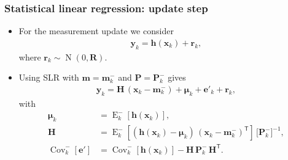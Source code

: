 \documentclass[first=dgreen,second=purple,presentation]{elecslides}
\newcommand{\mbf}[1]{\mathbf{#1}}
\newcommand{\mathbold}[1]{\bm{#1}}
\newcommand{\T}[0]{\mathsf{T}}
\DeclareMathOperator{\Cov}{Cov}
\DeclareMathOperator{\E}{E}
\DeclareMathOperator{\N}{N}
\newcommand{\vmu}[0]{\mathbold{\mu}}
\newcommand{\ve}{\mbf{e}}
\newcommand{\vh}{\mbf{h}}
\newcommand{\vm}{\mbf{m}}
\newcommand{\vr}{\mbf{r}}
\newcommand{\vx}{\mbf{x}}
\newcommand{\vy}{\mbf{y}}
\newcommand{\MH}{\mbf{H}}
\newcommand{\MP}{\mbf{P}}
\newcommand{\MR}{\mbf{R}}
\begin{document}
\begin{frame}
 \frametitle{Statistical linear regression: update step}

\begin{itemize}[<+->]
\item For the \alert{measurement update} we consider
%
\begin{equation}
\begin{split}
  \vy_k = \vh(\vx_k) + \vr_k,
\end{split}
\nonumber
\end{equation}
%
where $\vr_k \sim \N(0,\MR)$.

\item \alert{Using SLR} with $\vm = \vm_k^-$ and $\MP = \MP_k^-$ gives
%
\begin{equation}
\begin{split}
  \vy_{k} = \MH \, (\vx_{k} - \vm_{k}^-) + \vmu_k + \ve'_{k} + \vr_{k},
\end{split}
\nonumber
\end{equation}
%
with
%
\begin{equation}
\begin{split}
 \vmu_k &= \E_k^-[ \vh(\vx_{k})], \\
  \MH    &= \E_k^-\left[ (\vh(\vx_{k}) - \vmu_k) \, (\vx_{k} - \vm_{k}^-)^\T \right] \, \Big[ \MP_{k}^- \Big]^{-1}, \\
  \Cov_k^-[\ve'] &= \Cov_k^-[ \vh(\vx_{k}) ] - \MH \, \MP_{k}^- \, \MH^\T.
\end{split}
\nonumber
\end{equation}
%
\end{itemize}
\end{frame}
\end{document}

